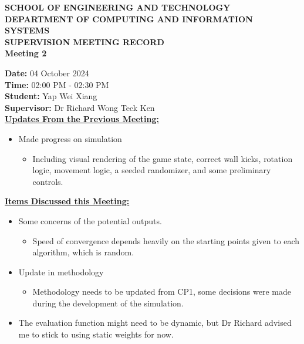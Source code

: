 \documentclass[a4paper, 12pt]{report}
\begin{document}
	
	\onehalfspacing
	
	\begin{center}
		
		\textbf{\large SCHOOL OF ENGINEERING AND TECHNOLOGY}	\\
		\textbf{\small DEPARTMENT OF COMPUTING AND INFORMATION SYSTEMS} \\
		\vspace{1cm}
		\textbf{\LARGE SUPERVISION MEETING RECORD}\\
		\textbf{\normalsize Meeting 2}	%
		
	\end{center}
	
	\noindent			%
	\textbf{Date: } 04 October 2024 \\	%
	\textbf{Time: } 02:00 PM - 02:30 PM \\	%
	\textbf{Student: } Yap Wei Xiang \\
	\textbf{Supervisor: } Dr Richard Wong Teck Ken \\
	
	\noindent			%
	\textbf{\underline{Updates From the Previous Meeting: }}
	\begin{itemize}	%
		\item Made progress on simulation
		\begin{itemize}
			\item Including visual rendering of the game state, correct wall kicks, rotation logic, movement logic, a seeded randomizer, and some preliminary controls.
		\end{itemize}
	\end{itemize}
	
	\noindent			%
	\textbf{\underline{Items Discussed this Meeting: }}
	\begin{itemize}	%
		\item Some concerns of the potential outputs.
		\begin{itemize}
			\item Speed of convergence depends heavily on the starting points given to each algorithm, which is random.
		\end{itemize}
		\item Update in methodology
		\begin{itemize}
			\item Methodology needs to be updated from CP1, some decisions were made during the development of the simulation.
		\end{itemize}
		\item The evaluation function might need to be dynamic, but Dr Richard advised me to stick to using static weights for now.
	\end{itemize}
	
\end{document}
